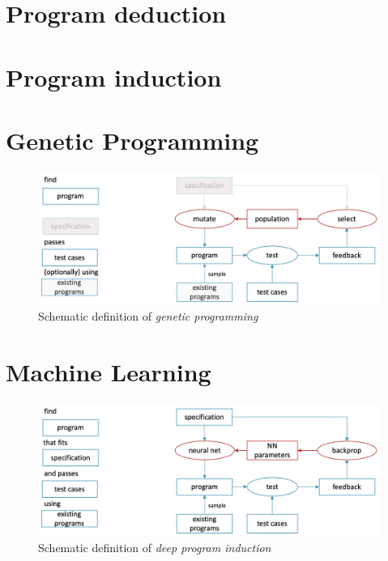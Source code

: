 \section{Program deduction}
\label{sec:deduction}

\section{Program induction}
\label{sec:induction}

\section{Genetic Programming}

\begin{figure}[H]
    \centering
    \includegraphics[width=\linewidth]{images/gp.png}
    \caption{Schematic definition of \emph{genetic programming}}
    \label{fig:ap}
\end{figure}

\section{Machine Learning}

\begin{figure}[H]
    \centering
    \includegraphics[width=\linewidth]{images/nps.png}
    \caption{Schematic definition of \emph{deep program induction}}
    \label{fig:ap}
\end{figure}